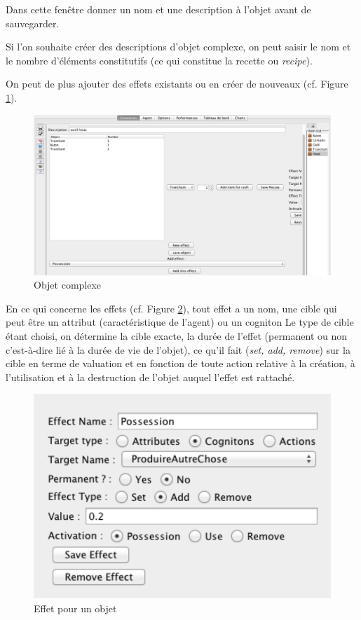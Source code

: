 Dans cette fenêtre donner un nom et une description à l'objet avant de sauvegarder.

Si l'on souhaite créer des descriptions d'objet complexe, on peut saisir le nom et le nombre d'éléments constitutifs (ce qui constitue la recette ou \textit{recipe}). 

On peut de plus ajouter des effets existants ou en créer de nouveaux (cf. Figure \ref{Ob2}).
\begin{figure}[!ht]
	\begin{center}
	\includegraphics[scale=0.3]{DocumentationSimulation/Objet2.pdf}
	\caption[Ob2]{Objet complexe \\}
	\label{Ob2}
	\end{center}
	\end{figure}
	
En ce qui concerne les effets (cf. Figure \ref{EF2}), tout effet a un nom, une cible qui peut être un attribut (caractéristique de l'agent) ou un cogniton %
Le type de cible étant choisi, on détermine la cible exacte, la durée de l'effet (permanent ou non c'est-à-dire  lié à la durée de vie de l'objet), ce qu'il fait (\textit{set, add, remove}) sur la cible en terme de valuation et en fonction de toute action relative à la création, à l'utilisation et à la destruction de l'objet auquel l'effet est rattaché.

\begin{figure}[!ht]
	\begin{center}
	\includegraphics[scale=0.6]{DocumentationSimulation/effet.pdf}
	\caption[EF2]{Effet pour un objet \\}
	\label{EF2}
	\end{center}
	\end{figure}
	
